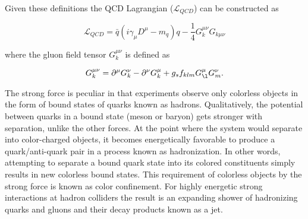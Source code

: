Given these definitions the QCD Lagrangian ($\mathcal{L}_{QCD}$) can be
constructed as 

\begin{equation} \label{eq:qcd:qcd_lagrangian}
\mathcal{L}_{QCD} = \bar{q}(i\gamma_{\mu}D^{\mu} - m_{q})q -
\frac{1}{4}G_{k}^{\mu\nu}G_{k\mu\nu}
\end{equation}

where the gluon field tensor $G_{k}^{\mu\nu}$ is defined as

\begin{equation} \label{eq:qcd:gluon_tensor}
G_{k}^{\mu\nu} = \partial^{\mu}G_{k}^{\nu} - \partial^{\nu}G_{k}^{\mu} +
g_{s}f_{klm}G_{\l}^{\mu}G_{m}^{\nu}.
\end{equation}

The strong force is peculiar in that experiments observe only colorless objects
in the form of bound states of quarks known as hadrons.  Qualitatively, the
potential between quarks in a bound state (meson or baryon) gets stronger with
separation, unlike the other forces.  At the point where the system would
separate into color-charged objects, it becomes energetically favorable to
produce a quark/anti-quark pair in a process known as hadronization.  In other
words, attempting to separate a bound quark state into its colored constituents
simply results in new colorless bound states.  This requirement of colorless
objects by the strong force is known as color confinement. For highly energetic
strong interactions at hadron colliders the result is an expanding shower of
hadronizing quarks and gluons and their decay products known as a jet.

